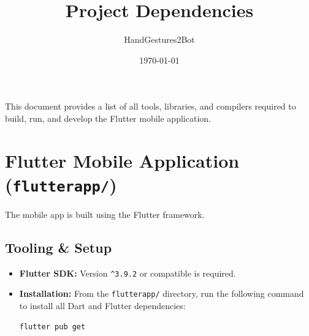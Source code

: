 \documentclass[11pt,a4paper]{article}
\title{\textbf{Project Dependencies}}
\author{HandGestures2Bot}
\date{\today}
\begin{document}
\maketitle
\thispagestyle{empty}
\tableofcontents
\newpage

This document provides a list of all tools, libraries, and compilers required to build, run, and develop the Flutter mobile application.

\section{Flutter Mobile Application (\texttt{flutterapp/})}
The mobile app is built using the Flutter framework.

\subsection{Tooling \& Setup}
\begin{itemize}
    \item \textbf{Flutter SDK:} Version \texttt{\^{}3.9.2} or compatible is required.
    \item \textbf{Installation:} From the \texttt{flutterapp/} directory, run the following command to install all Dart and Flutter dependencies:
    \begin{lstlisting}[language=bash]
flutter pub get
    \end{lstlisting}
\end{itemize}
\end{document}
